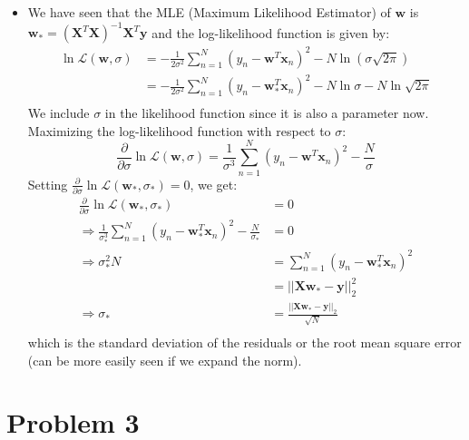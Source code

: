 \documentclass{article}
\newcommand{\mathbi}[1]{\boldsymbol{#1}}
\begin{document}
\begin{itemize}
\begin{itemize}
      \item[2.] We have seen that the MLE (Maximum Likelihood Estimator) of $\mathbi{w}$ is $\mathbi{w}_* = (\mathbi{X}^T \mathbi{X})^{-1} \mathbi{X}^T \mathbi{y}$ and the log-likelihood function is given by:
      \begin{align*}
        \ln \mathcal{L}(\mathbi{w}, \sigma) &= - \frac{1}{2 \sigma^2} \sum_{n=1}^{N} (y_n - \mathbi{w}^T \mathbi{x}_n)^2 - N \ln(\sigma \sqrt{2\pi}) \\
        &= - \frac{1}{2 \sigma^2} \sum_{n=1}^{N} (y_n - \mathbi{w}_*^T \mathbi{x}_n)^2 - N \ln \sigma - N \ln \sqrt{2\pi} \\
      \end{align*}
      We include $\sigma$ in the likelihood function since it is also a parameter now.
      Maximizing the log-likelihood function with respect to $\sigma$:
      \[
        \frac{\partial}{\partial \sigma} \ln \mathcal{L}(\mathbi{w}, \sigma) = \frac{1}{\sigma^3} \sum_{n=1}^{N} (y_n - \mathbi{w}^T \mathbi{x}_n)^2 - \frac{N}{\sigma}
      \]
      Setting $\frac{\partial}{\partial \sigma} \ln \mathcal{L}(\mathbi{w}_*, \sigma_*) = 0$, we get:
      \begin{align*}
        \frac{\partial}{\partial \sigma} \ln \mathcal{L}(\mathbi{w}_*, \sigma_*) &= 0 \\
        \Rightarrow \frac{1}{\sigma_*^3} \sum_{n=1}^{N} (y_n - \mathbi{w}_*^T \mathbi{x}_n)^2 - \frac{N}{\sigma_*} &= 0 \\
        \Rightarrow \sigma_*^2 N &= \sum_{n=1}^{N} (y_n - \mathbi{w}_*^T \mathbi{x}_n)^2 \\
        &= ||\mathbi{X} \mathbi{w}_* - \mathbi{y}||_2^2 \\
        \Rightarrow \sigma_* &= \frac{||\mathbi{X} \mathbi{w}_* - \mathbi{y}||_2}{\sqrt{N}} \\
      \end{align*}
      which is the standard deviation of the residuals or the root mean square error (can be more easily seen if we expand the norm).
    \end{itemize}
  \end{itemize}
  
\section{Problem 3}
  
\end{document}
